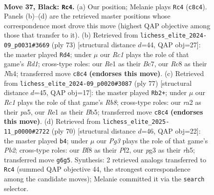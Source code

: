 \documentclass[11pt]{article}
\begin{document}
\clearpage

\begin{figure}[p]\centering
\begin{subfigure}{0.46\textwidth}\centering
\resizebox{\linewidth}{!}{%
\newchessgame
\chessboard[
  setfen={2r2b2/pp5k/6p1/5p1p/P7/2N3P1/RPP2PKP/4r3 b - - 1 37},
  showmover=false,
  pgfstyle=straightmove, color=movearrow, markmove={c8-c4}
]}
\caption{}
\end{subfigure}\hfill
\begin{subfigure}{0.46\textwidth}\centering
\resizebox{\linewidth}{!}{%
\newchessgame
\chessboard[
  setfen={3r2k1/2b3p1/4p2p/8/4P2n/PR1N3P/1P3PP1/6K1 b - - 2 37},
  showmover=false,
  pgfstyle=straightmove, color=movearrow, markmove={d8-d4}
]}
\caption{}
\end{subfigure}
\\[4pt]
\begin{subfigure}{0.46\textwidth}\centering
\resizebox{\linewidth}{!}{%
\newchessgame
\chessboard[
  setfen={6k1/1p3pp1/2p5/Pb6/1P1R3p/4NP1P/5KP1/1r6 b - - 4 39},
  showmover=false,
  pgfstyle=straightmove, color=movearrow, markmove={b1-b2}
]}
\caption{}
\end{subfigure}\hfill
\begin{subfigure}{0.46\textwidth}\centering
\resizebox{\linewidth}{!}{%
\newchessgame
\chessboard[
  setfen={8/p5R1/1pnkp2p/3p3r/8/P7/1P3PK1/2R5 w - - 0 36},
  showmover=false,
  pgfstyle=straightmove, color=movearrow, markmove={b2-b4}
]}
\caption{}
\end{subfigure}
\caption{\textbf{Move 37, Black: \texttt{Rc4}.} (a) Our position; Melanie plays \texttt{Rc4} (\texttt{c8c4}). Panels (b)--(d) are the retrieved master positions whose correspondence most drove this move (highest QAP objective among those that transfer to it). (b) Retrieved from \texttt{lichess\_elite\_2024-09\_p0031\#3669} (ply 73) [structural distance $d$=44, QAP obj=27]: the master played \texttt{Rd4}; under $\mu$ our \emph{Rc1} plays the role of that game's \emph{Rd1}; cross-type roles: our \emph{R}e1 as their \emph{B}c7, our \emph{R}c8 as their \emph{N}h4; transferred move \texttt{c8c4} \textbf{(endorses this move)}. (c) Retrieved from \texttt{lichess\_elite\_2024-09\_p0020\#3087} (ply 77) [structural distance $d$=45, QAP obj=17]: the master played \texttt{Rb2+}; under $\mu$ our \emph{Rc1} plays the role of that game's \emph{Rb8}; cross-type roles: our \emph{r}a2 as their \emph{p}a5, our \emph{R}e1 as their \emph{B}b5; transferred move \texttt{c8c4} \textbf{(endorses this move)}. (d) Retrieved from \texttt{lichess\_elite\_2025-11\_p0000\#2722} (ply 70) [structural distance $d$=46, QAP obj=22]: the master played \texttt{b4}; under $\mu$ our \emph{Pg3} plays the role of that game's \emph{Pb2}; cross-type roles: our \emph{B}f8 as their \emph{P}f2, our \emph{p}g3 as their \emph{r}h5; transferred move \texttt{g6g5}. Synthesis: 2 retrieved analogs transferred to \texttt{Rc4} (summed QAP objective 44, the strongest correspondence among the candidate moves); Melanie committed it via the \texttt{search} selector.}
\label{fig:thought-m73}
\end{figure}
\end{document}
